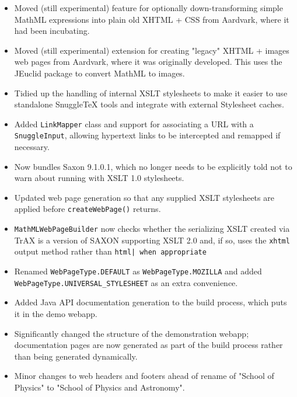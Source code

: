 \begin{itemize}
  \item Moved (still experimental) feature for optionally down-transforming
  simple MathML expressions into plain old XHTML + CSS from Aardvark, where it
  had been incubating.

  \item Moved (still experimental) extension for creating "legacy" XHTML +
  images web pages from Aardvark, where it was originally developed. This uses
  the JEuclid package to convert MathML to images.

  \item Tidied up the handling of internal XSLT stylesheets to make it easier
  to use standalone SnuggleTeX tools and integrate with external Stylesheet
  caches.

  \item Added \verb|LinkMapper| class and support for associating a URL with a
  \verb|SnuggleInput|, allowing hypertext links to be intercepted and remapped
  if necessary.

  \item Now bundles Saxon 9.1.0.1, which no longer needs to be explicitly told
  not to warn about running with XSLT 1.0 stylesheets.

  \item Updated web page generation so that any supplied XSLT stylesheets are
  applied before \verb|createWebPage()| returns.

  \item \verb|MathMLWebPageBuilder| now checks whether the serializing XSLT
  created via TrAX is a version of SAXON supporting XSLT 2.0 and, if so,
  uses the \verb|xhtml| output method rather than \verb.html| when appropriate.

  \item Renamed \verb|WebPageType.DEFAULT| as \verb|WebPageType.MOZILLA| and
  added \verb|WebPageType.UNIVERSAL_STYLESHEET| as an extra convenience.

  \item Added Java API documentation generation to the build process, which
  puts it in the demo webapp.

  \item Significantly changed the structure of the demonstration webapp;
  documentation pages are now generated as part of the build process rather
  than being generated dynamically.

  \item Minor changes to web headers and footers ahead of rename of "School of
  Physics" to "School of Physics and Astronomy".


\end{itemize}
